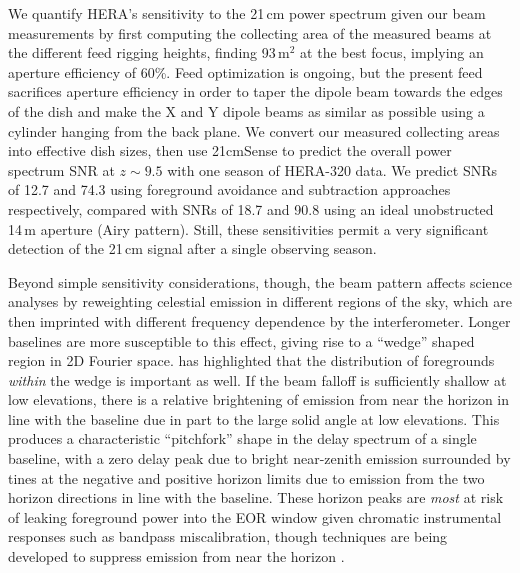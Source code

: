 \documentclass{emulateapj}
\begin{document}
We quantify HERA's sensitivity to the 21\,cm power spectrum given our beam measurements by first computing the collecting area of the measured beams at the different feed rigging heights, finding 93\,m$^2$ at the best focus, implying an aperture efficiency of 60\%. Feed optimization is ongoing, but the present feed sacrifices aperture efficiency in order to taper the dipole beam towards the edges of the dish and make the X and Y dipole beams as similar as possible using a cylinder hanging from the back plane. We convert our measured collecting areas into effective dish sizes, then use 21cmSense to predict the overall power spectrum SNR at $z\sim9.5$ with one season of HERA-320 data. We predict SNRs of 12.7 and 74.3 using foreground avoidance and subtraction approaches respectively, compared with SNRs of 18.7 and 90.8 using an ideal unobstructed 14\,m aperture (Airy pattern). Still, these sensitivities permit a very significant detection of the 21\,cm signal after a single observing season.

Beyond simple sensitivity considerations, though, the beam pattern affects science analyses by reweighting celestial emission in different regions of the sky, which are then imprinted with different frequency dependence by the interferometer. Longer baselines are more susceptible to this effect, giving rise to a ``wedge'' shaped region in 2D Fourier space. \citet{nithya15} has highlighted that the distribution of foregrounds \textit{within} the wedge is important as well. If the beam falloff is sufficiently shallow at low elevations, there is a relative brightening of emission from near the horizon in line with the baseline due in part to the large solid angle at low elevations. This produces a characteristic ``pitchfork'' shape in the delay spectrum of a single baseline, with a zero delay peak due to bright near-zenith emission surrounded by tines at the negative and positive horizon limits due to emission from the two horizon directions in line with the baseline. These horizon peaks are \textit{most} at risk of leaking foreground power into the EOR window given chromatic instrumental responses such as bandpass miscalibration, though techniques are being developed to suppress emission from near the horizon \citep{parsonsoptimalfringeratefiltering}.
\end{document}
